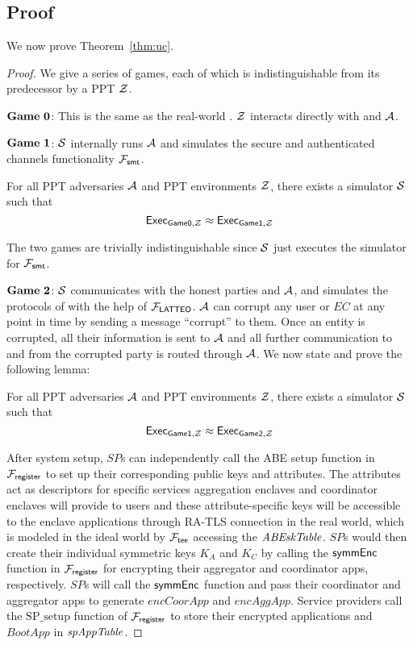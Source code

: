 




\subsection{Proof}

We now prove Theorem~\ref{thm:uc}.

\begin{proof}
We give a series of games, each of which is indistinguishable from its predecessor by a PPT $\mathcal{Z}$.

$\mathbf{Game~0}$: This is the same as the real-world \sysname. $\mathcal{Z}$ interacts directly with \sysname and $\mathcal{A}$.

$\mathbf{Game~1}$: $\mathcal{S}$ internally runs $\mathcal{A}$ and simulates the secure and authenticated channels functionality $\mathcal{F}_{\mathsf{smt}}$. 
    \begin{lemma}
    \label{lem:lem1}
    For all PPT adversaries $\mathcal{A}$ and PPT environments $\mathcal{Z}$, there exists a simulator $\mathcal{S}$ such that 
    $$ \mathsf{Exec_{\mathsf{Game0},\mathcal{Z}}} \approx \mathsf{Exec_{\mathsf{Game1},\mathcal{Z}}}
    $$ \end{lemma}
    The two games are trivially indistinguishable since $\mathcal{S}$ just executes the simulator for $\mathcal{F}_{\mathsf{smt}}$.

$\mathbf{Game~2}$: $\mathcal{S}$ communicates with the honest parties and $\mathcal{A}$, and simulates the protocols of \sysname with the help of $\mathcal{F}_{\mathsf{LATTEO}}$. $\mathcal{A}$ can corrupt any user or $EC$ at any point in time by sending a message ``corrupt'' to them. Once an entity is corrupted, all their information is sent to $\mathcal{A}$ and all further communication to and from the corrupted party is routed through $\mathcal{A}$. We now state and prove the following lemma:

\begin{lemma}
\label{lem:lem2}
For all PPT adversaries $\mathcal{A}$ and PPT environments $\mathcal{Z}$, there exists a simulator $\mathcal{S}$ such that  
$$\mathsf{Exec_{\mathsf{Game1},\mathcal{Z}}} \approx \mathsf{Exec_{\mathsf{Game2},\mathcal{Z}}}$$
\end{lemma}

 After system setup, $SP$s can independently call the ABE setup function in $\mathcal{F}_{\mathsf{register}}$ to set up their corresponding public keys and attributes. The attributes act as descriptors for specific services aggregation enclaves and coordinator enclaves will provide to users and these attribute-specific keys will be accessible to the enclave applications through RA-TLS connection in the real world, which is modeled in the ideal world by $\mathcal{F}_{\mathsf{tee}}$ accessing the $\mathit{ABEskTable}$. $SP$s would then create their individual symmetric keys $K_A$ and $K_C$ by calling the $\mathsf{symmEnc}$ function in $\mathcal{F}_{\mathsf{register}}$ for encrypting their aggregator and coordinator apps, respectively. $SP$s will call the $\mathsf{symmEnc}$ function and pass their coordinator and aggregator apps to generate $encCoorApp$ and $encAggApp$. Service providers call the $\mathrm{SP\_setup}$ function of $\mathcal{F}_{\mathsf{register}}$ to store their encrypted applications and $BootApp$ in $\mathit{spAppTable}$. 


\end{proof}

